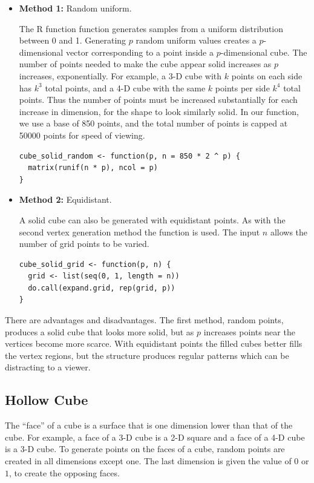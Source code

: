 \begin{itemize}

  \item {\bf Method 1:} Random uniform.

    The R function  function generates samples from a
    uniform distribution between 0 and 1. Generating $p$ random
    uniform values creates a $p$-dimensional vector corresponding to a
    point inside a $p$-dimensional cube. The number of points needed
    to make the cube appear solid increases as $p$ increases, exponentially.  For example, a 3-D
    cube with $k$ points on each side has  $k^3$ total points, and a 4-D cube
    with the same $k$ points per side $k^4$ total points. Thus the number
    of points must be increased substantially for each increase in
    dimension, for the shape to look similarly solid. In our function, we use a base of 850 points, and the total
    number of points is capped at 50000 points for speed of viewing.

\begin{verbatim}
cube_solid_random <- function(p, n = 850 * 2 ^ p) {
  matrix(runif(n * p), ncol = p)
}
\end{verbatim}

  \item {\bf Method 2:} Equidistant.

    A solid cube can also be generated with equidistant points. As
    with the second vertex generation method the 
    function is used. The input $n$ allows the number of grid points
    to be varied.

\begin{verbatim}
cube_solid_grid <- function(p, n) {
  grid <- list(seq(0, 1, length = n))
  do.call(expand.grid, rep(grid, p))
}
\end{verbatim}
\end{itemize}

There are advantages and disadvantages.  The first method, random
points, produces a solid cube that looks more solid, but as $p$
increases points near the vertices become more scarce.  With
equidistant points the filled cubes better fills the vertex regions, but the structure  produces regular patterns which can be distracting to a viewer.

\subsection{Hollow Cube}

The ``face'' of a cube is a surface that is one dimension lower than
that of the cube.  For example, a face of a 3-D cube is a 2-D square
and a face of a 4-D cube is a 3-D cube. To generate points on the
faces of a cube, random points are created in all dimensions except
one. The last dimension is given the value of $0$ or $1$, to create
the opposing faces.

